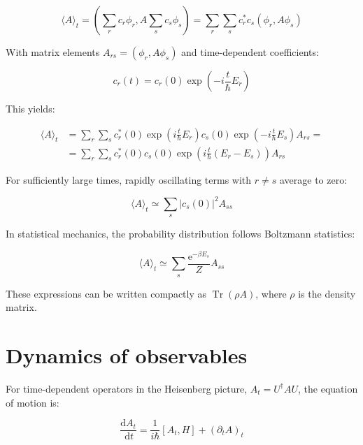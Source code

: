\begin{equation}
\langle A\rangle_{t}=\left(\sum_{r} c_{r} \phi_{r}, A \sum_{s} c_{s} \phi_{s}\right)=\sum_{r} \sum_{s} c_{r}^{*} c_{s}\left(\phi_{r}, A \phi_{s}\right)
\end{equation}

With matrix elements $A_{rs} = (\phi_r, A\phi_s)$ and time-dependent coefficients:

\begin{equation}
c_{r}(t)=c_{r}(0) \exp \left(-i \frac{t}{\hbar} E_{r}\right)
\end{equation}

This yields:

\begin{align}
\langle A\rangle_{t} & =\sum_{r} \sum_{s} c_{r}^{*}(0) \exp \left(i \frac{t}{\hbar} E_{r}\right) c_{s}(0) \exp \left(-i \frac{t}{\hbar} E_{s}\right) A_{r s}= \\
& =\sum_{r} \sum_{s} c_{r}^{*}(0) c_{s}(0) \exp \left(i \frac{t}{\hbar}\left(E_{r}-E_{s}\right)\right) A_{r s}
\end{align}

For sufficiently large times, rapidly oscillating terms with $r \neq s$ average to zero:

\begin{equation}
\langle A\rangle_{t} \simeq \sum_{s}\left|c_{s}(0)\right|^{2} A_{s s}
\end{equation}

In statistical mechanics, the probability distribution follows Boltzmann statistics:

\begin{equation}
\langle A\rangle_{t} \simeq \sum_{s} \frac{\mathrm{e}^{-\beta E_{s}}}{Z} A_{s s}
\end{equation}

These expressions can be written compactly as $\operatorname{Tr}(\rho A)$, where $\rho$ is the density matrix.

\section{Dynamics of observables}
For time-dependent operators in the Heisenberg picture, $A_t = U^\dagger A U$, the equation of motion is:

\begin{equation}
\frac{\mathrm{d} A_{t}}{\, \mathrm{d} t}=\frac{1}{i \hbar}\left[A_{t}, H\right]+\left(\partial_{t} A\right)_{t}
\end{equation}


